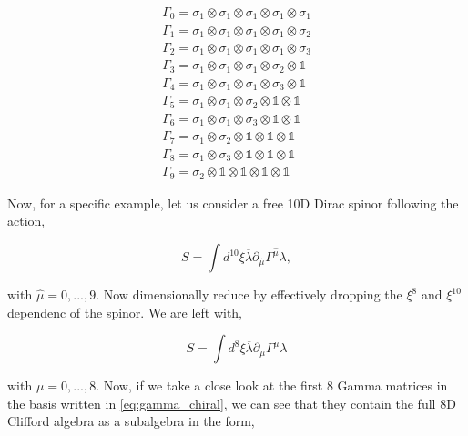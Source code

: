 \begin{equation}
    \label{eq:gamma_chiral}
    \begin{aligned}
        \Gamma_0 = \sigma_1 \otimes \sigma_1 \otimes \sigma_1 \otimes \sigma_1 \otimes \sigma_1\\
        \Gamma_1 = \sigma_1 \otimes \sigma_1 \otimes \sigma_1 \otimes \sigma_1 \otimes \sigma_2\\
        \Gamma_2 = \sigma_1 \otimes \sigma_1 \otimes \sigma_1 \otimes \sigma_1 \otimes \sigma_3\\
        \Gamma_3 = \sigma_1 \otimes \sigma_1 \otimes \sigma_1 \otimes \sigma_2 \otimes \mathbb{1}\\
        \Gamma_4 = \sigma_1 \otimes \sigma_1 \otimes \sigma_1 \otimes \sigma_3 \otimes \mathbb{1}\\
        \Gamma_5 = \sigma_1 \otimes \sigma_1 \otimes \sigma_2 \otimes \mathbb{1} \otimes \mathbb{1}\\
        \Gamma_6 = \sigma_1 \otimes \sigma_1 \otimes \sigma_3 \otimes \mathbb{1} \otimes \mathbb{1}\\
        \Gamma_7 = \sigma_1 \otimes \sigma_2 \otimes \mathbb{1} \otimes \mathbb{1} \otimes \mathbb{1}\\
        \Gamma_8 = \sigma_1 \otimes \sigma_3 \otimes \mathbb{1} \otimes \mathbb{1} \otimes \mathbb{1}\\
        \Gamma_9 = \sigma_2 \otimes \mathbb{1} \otimes \mathbb{1} \otimes \mathbb{1} \otimes \mathbb{1}
    \end{aligned}
\end{equation}

Now, for a specific example, let us consider a free 10D Dirac spinor following the action,

\begin{equation}
    S = \int d^{10} \xi \overline{\lambda} \partial_{\hat{\mu}} \Gamma^{\hat{\mu}} \lambda,
\end{equation}

with $\hat{\mu} = 0,...,9$. Now dimensionally reduce by effectively dropping the $\xi^8$ and $\xi^{10}$ dependenc of the spinor. We are left with,

\begin{equation}
    S = \int d^8 \xi \overline{\lambda} \partial_\mu \Gamma^\mu \lambda
\end{equation}

with $\mu = 0,...,8$. Now, if we take a close look at the first 8 Gamma matrices in the basis written in \ref{eq:gamma_chiral}, we can see that they contain the full 8D Clifford algebra as a subalgebra in the form,

